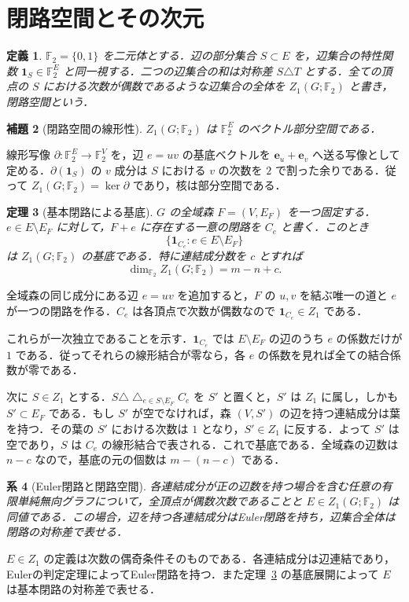 \documentclass[a5paper,10pt,onecolumn]{jsarticle}
\makeatletter
\theoremstyle{mathnotetheorem}
\newtheorem{theorem}{定理}[section]
\newtheorem{definition}[theorem]{定義}
\newtheorem{lemma}[theorem]{補題}
\newtheorem{corollary}[theorem]{系}
\renewcommand{\proofname}{証明}
\renewenvironment{proof}[1][\proofname]{%
  \par\pushQED{\qed}\normalfont\topsep4\p@\@plus2\p@\relax
  \trivlist\item[\hskip\labelsep\bfseries #1]\ignorespaces
}{\popQED\endtrivlist\@endpefalse}
\makeatother
\begin{document}
\section{閉路空間とその次元}
\begin{definition}
$\mathbb F_2=\{0,1\}$ を二元体とする．辺の部分集合 $S\subset E$ を，辺集合の特性関数 $\mathbf1_S\in\mathbb F_2^E$ と同一視する．二つの辺集合の和は対称差 $S\triangle T$ とする．全ての頂点の $S$ における次数が偶数であるような辺集合の全体を $Z_1(G;\mathbb F_2)$ と書き，\emph{閉路空間}という．
\end{definition}
\begin{lemma}[閉路空間の線形性]
$Z_1(G;\mathbb F_2)$ は $\mathbb F_2^E$ のベクトル部分空間である．
\end{lemma}
\begin{proof}
線形写像 $\partial:\mathbb F_2^E\to\mathbb F_2^V$ を，辺 $e=uv$ の基底ベクトルを $\mathbf e_u+\mathbf e_v$ へ送る写像として定める．$\partial(\mathbf1_S)$ の $v$ 成分は $S$ における $v$ の次数を $2$ で割った余りである．従って $Z_1(G;\mathbb F_2)=\ker\partial$ であり，核は部分空間である．
\end{proof}
\begin{theorem}[基本閉路による基底]\label{thm:cyclespace}
$G$ の全域森 $F=(V,E_F)$ を一つ固定する．$e\in E\setminus E_F$ に対して，$F+e$ に存在する一意の閉路を $C_e$ と書く．このとき
\[
 \{\mathbf1_{C_e}:e\in E\setminus E_F\}
\]
は $Z_1(G;\mathbb F_2)$ の基底である．特に連結成分数を $c$ とすれば
\[
 \dim_{\mathbb F_2} Z_1(G;\mathbb F_2)=m-n+c.
\]
\end{theorem}
\begin{proof}
全域森の同じ成分にある辺 $e=uv$ を追加すると，$F$ の $u,v$ を結ぶ唯一の道と $e$ が一つの閉路を作る．$C_e$ は各頂点で次数が偶数なので $\mathbf1_{C_e}\in Z_1$ である．

これらが一次独立であることを示す．$\mathbf1_{C_e}$ では $E\setminus E_F$ の辺のうち $e$ の係数だけが $1$ である．従ってそれらの線形結合が零なら，各 $e$ の係数を見れば全ての結合係数が零である．

次に $S\in Z_1$ とする．$S\triangle\bigtriangleup_{e\in S\setminus E_F}C_e$ を $S'$ と置くと，$S'$ は $Z_1$ に属し，しかも $S'\subset E_F$ である．もし $S'$ が空でなければ，森 $(V,S')$ の辺を持つ連結成分は葉を持つ．その葉の $S'$ における次数は $1$ となり，$S'\in Z_1$ に反する．よって $S'$ は空であり，$S$ は $C_e$ の線形結合で表される．これで基底である．全域森の辺数は $n-c$ なので，基底の元の個数は $m-(n-c)$ である．
\end{proof}
\begin{corollary}[Euler閉路と閉路空間]
各連結成分が正の辺数を持つ場合を含む任意の有限単純無向グラフについて，全頂点が偶数次数であることと $E\in Z_1(G;\mathbb F_2)$ は同値である．この場合，辺を持つ各連結成分はEuler閉路を持ち，辺集合全体は閉路の対称差で表せる．
\end{corollary}
\begin{proof}
$E\in Z_1$ の定義は次数の偶奇条件そのものである．各連結成分は辺連結であり，Eulerの判定定理によってEuler閉路を持つ．また定理~\ref{thm:cyclespace} の基底展開によって $E$ は基本閉路の対称差で表せる．
\end{proof}
\end{document}
